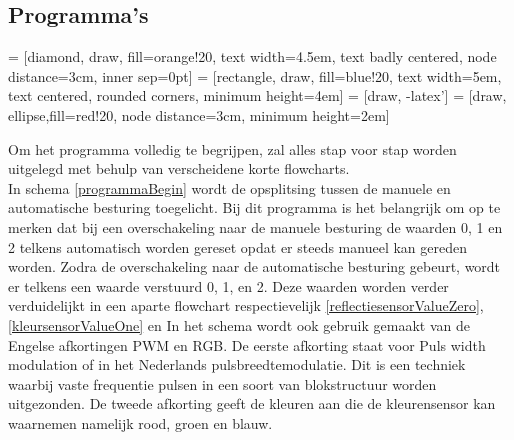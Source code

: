 \documentclass[a4paper,twoside,kulak]{kulakreport} %
\begin{document}
\subsection{Programma's}\label{definitieve programma's}
 = [diamond, draw, fill=orange!20, text width=4.5em, text badly centered, node distance=3cm, inner sep=0pt]
 = [rectangle, draw, fill=blue!20, text width=5em, text centered, rounded corners, minimum height=4em]
 = [draw, -latex']
 = [draw, ellipse,fill=red!20, node distance=3cm,
minimum height=2em]


Om het programma volledig te begrijpen, zal alles stap voor stap worden uitgelegd met behulp van verscheidene korte flowcharts. \\

In schema \ref{programmaBegin} wordt de opsplitsing tussen de manuele en automatische besturing toegelicht. Bij dit programma is het belangrijk om op te merken dat bij een overschakeling naar de manuele besturing de waarden 0, 1 en 2 telkens automatisch worden gereset opdat er steeds manueel kan gereden worden. %
Zodra de overschakeling naar de automatische besturing gebeurt, wordt er telkens een waarde verstuurd 0, 1, en 2. Deze waarden worden verder verduidelijkt in een aparte flowchart respectievelijk \ref{reflectiesensorValueZero}, \ref{kleursensorValueOne} en %
In het schema wordt ook gebruik gemaakt van de Engelse afkortingen PWM en RGB. De eerste afkorting staat voor Puls width modulation of in het Nederlands pulsbreedtemodulatie. Dit is een techniek waarbij vaste frequentie pulsen in een soort van blokstructuur worden uitgezonden.%
De tweede afkorting geeft de kleuren aan die de kleurensensor kan waarnemen namelijk rood, groen en blauw.
\\
\end{document}
